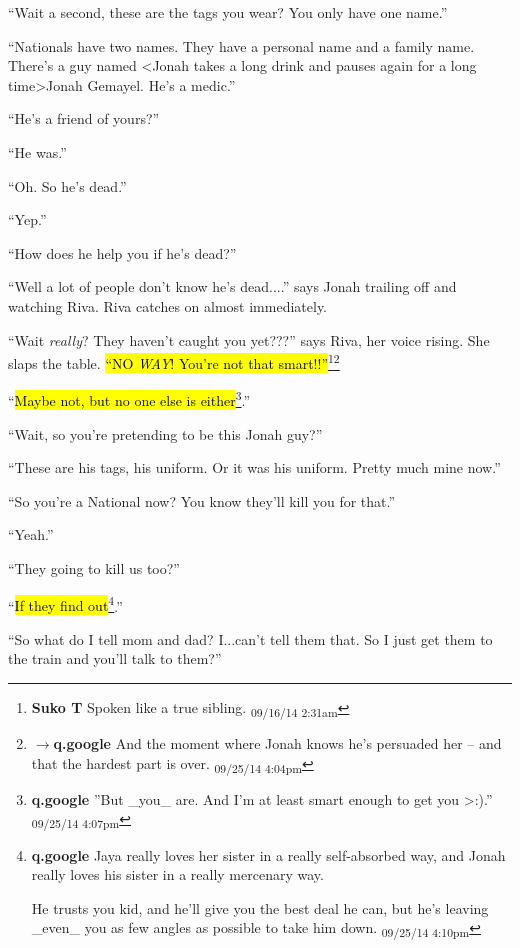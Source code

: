 ``Wait a second, these are the tags you wear?  You only have one name.''

``Nationals have two names.  They have a personal name and a family name.  There's a guy named \textless Jonah takes a long drink and pauses again for a long time\textgreater  Jonah Gemayel.  He's a medic.''

``He's a friend of yours?''

``He was.''

``Oh.  So he's dead.''

``Yep.''

``How does he help you if he's dead?''

``Well a lot of people don't know he's dead....'' says Jonah trailing off and watching Riva.  Riva catches on almost immediately.

``Wait \textit{really}?  They haven't caught you yet???'' says Riva, her voice rising.  She slaps the table.  \hl{``NO \textit{WAY}!  You're not that smart!!''}\footnote{\textbf{Suko T }Spoken like a true sibling. \textsubscript{09/16/14 2:31am}}\footnote{$\rightarrow$\textbf{q.google }And the moment where Jonah knows he's persuaded her -- and that the hardest part is over. \textsubscript{09/25/14 4:04pm}}

``\hl{Maybe not, but no one else is either}\footnote{\textbf{q.google }''But \_you\_ are.  And I'm at least smart enough to get you \textgreater :).'' \textsubscript{09/25/14 4:07pm}}.''

``Wait, so you're pretending to be this Jonah guy?''

``These are his tags, his uniform.  Or it was his uniform.  Pretty much mine now.''

``So you're a National now?  You know they'll kill you for that.''

``Yeah.''

``They going to kill us too?''

``\hl{If they find out}\footnote{\textbf{q.google }Jaya really loves her sister in a really self-absorbed way, and Jonah really loves his sister in a really mercenary way.

He trusts you kid, and he'll give you the best deal he can, but he's leaving \_even\_ you as few angles as possible to take him down. \textsubscript{09/25/14 4:10pm}}.''

``So what do I tell mom and dad?  I...can't tell them that.  So I just get them to the train and you'll talk to them?''

